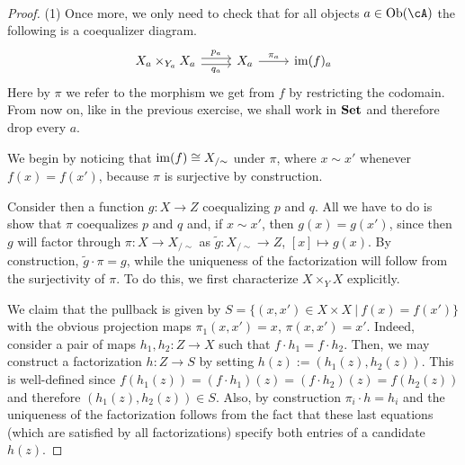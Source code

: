 \documentclass[a4paper,11pt,openany]{scrartcl}
\begin{document}
~\\
\begin{proof}
    (1) Once more, we only need to check that for all objects $a\in\Ob(\cA)$ the
    following is a coequalizer diagram.
    \[\begin{tikzcd}
	{X_a\times_{Y_a}X_a} & {X_a} & {\im(f)_a}
	\arrow["{p_a}", from=1-1, to=1-2, shift left=1]
	\arrow["{q_a}"', from=1-1, to=1-2, shift right=1]
	\arrow["{\pi_a}"', from=1-2, to=1-3, swap]
    \end{tikzcd}\]
    Here by $\pi$ we refer to the morphism we get from $f$ by restricting the
    codomain. From now on, like in the previous
    exercise, we shall work in $\operatorname{\mathbf{Set}}$ and therefore drop every $a$.

    We begin by noticing that $\operatorname{im}(f)\cong X_{/\sim}$ under $\pi$, where $x\sim x'$
    whenever $f(x)=f(x')$, because $\pi$ is surjective by construction.

    Consider then a function $g\colon X\rightarrow Z$ coequalizing $p$ and $q$.
    All we have to do is show that $\pi$ coequalizes $p$ and $q$ and, if $x\sim
    x'$, then $g(x)=g(x')$, since then
    $g$ will factor through $\pi\colon X\rightarrow X_{/\sim}$ as
    $\tilde{g}\colon X_{/\sim}\rightarrow Z$, $[x]\mapsto g(x)$. By construction,
    $\tilde{g}\cdot\pi=g$, while the uniqueness of the
    factorization will follow from the surjectivity of $\pi$. To do this, we
    first characterize $X\times_YX$ explicitly.

    We claim that the pullback is given by $S=\{(x,x')\in X\times X\ |\
    f(x)=f(x')\}$ with the obvious projection maps $\pi_1(x,x')=x$,
    $\pi(x,x')=x'$. Indeed, consider a pair of maps $h_1,h_2\colon Z\rightarrow
    X$ such that $f\cdot h_1=f\cdot h_2$. Then, we may construct a factorization
    $h\colon Z\rightarrow S$ by setting $h(z):=(h_1(z),h_2(z))$. This is
    well-defined since $f(h_1(z))=(f\cdot h_1)(z)=(f\cdot h_2)(z)=f(h_2(z))$ and
    therefore $(h_1(z),h_2(z))\in S$. Also, by construction $\pi_i\cdot h=h_i$
    and the uniqueness of the factorization follows from the fact that these
    last equations (which are satisfied by all factorizations) specify both
    entries of a candidate $h(z)$.


\end{proof}
\end{document}
